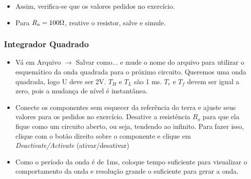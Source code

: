
\begin{itemize}
    \item Assim, verifica-se que os valores pedidos no exercício.
\end{itemize}


\begin{itemize}
    \item Para $R_o=100\ohm$, reative o resistor, salve e simule.
\end{itemize}


\subsubsection{Integrador Quadrado}

\begin{itemize}
    \item Vá em Arquivo $\rightarrow$ Salvar como... e mude o nome do
    arquivo para utilizar o esquemático da onda
    quadrada para o próximo circuito. Queremos uma
    onda quadrada, logo U deve ser 2V. $T_H$ e $T_L$ são 1 ms.
    $T_r$ e $T_f$ devem ser igual a zero, pois a mudança de
    nível é instantânea.
\end{itemize}


\begin{itemize}
    \item Conecte os componentes sem esquecer da
    referência do terra e ajuste seus valores para os
    pedidos no exercício. Desative a resistência $R_o$ para
    que ela fique como um circuito aberto, ou seja,
    tendendo ao infinito. Para fazer isso, clique com o botão direito sobre o componente e clique em \textit{Deactivate/Activate} (ativar/desativar)
\end{itemize}


\begin{itemize}
    \item Como o período da onda é de 1ms, coloque tempo
    suficiente para visualizar o comportamento da onda
    e resolução grande o suficiente para gerar a onda.
\end{itemize}

